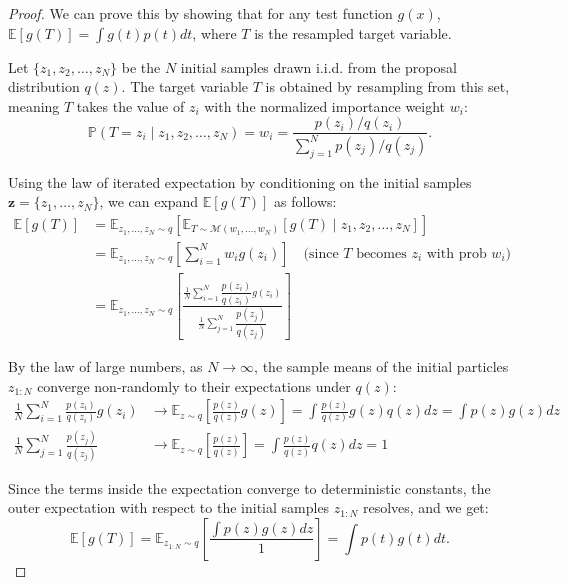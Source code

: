 \documentclass{article}
\begin{document}
        \begin{proof}
            We can prove this by showing that for any test function $g(x)$, $\mathbb{E}[g(T)] = \displaystyle\int g(t)p(t)dt$, where $T$ is the resampled target variable.
            
            Let $\{z_1, z_2, \dots, z_N\}$ be the $N$ initial samples drawn i.i.d. from the proposal distribution $q(z)$. 
            The target variable $T$ is obtained by resampling from this set, meaning $T$ takes the value of $z_i$ with the normalized importance weight $w_i$:
            \[
            \mathbb P(T = z_i \mid z_1, z_2, \dots, z_N) = w_i = \frac{p(z_i)/q(z_i)}{\sum_{j=1}^{N} p(z_j)/q(z_j)}.
            \]
            
            Using the law of iterated expectation by conditioning on the initial samples $\mathbf{z} = \{z_1, \dots, z_N\}$, we can expand $\mathbb{E}[g(T)]$ as follows:
            \begin{align*}
                \mathbb{E}[g(T)] &= \mathbb{E}_{z_1,\dots,z_N \sim q}\left[\mathbb{E}_{T \sim \mathcal M(w_1,\dots,w_N)}[g(T) \mid z_1,z_2,\dots,z_N]\right]
                \\ &= \mathbb{E}_{z_1,\dots,z_N \sim q}\left[\sum_{i=1}^{N} w_i g(z_i)\right] \quad \text{(since } T \text{ becomes } z_i \text{ with prob } w_i \text{)}
                \\ &= \mathbb{E}_{z_1,\dots,z_N \sim q}\left[\frac{\displaystyle\frac{1}{N}\sum_{i=1}^{N}\dfrac{p(z_i)}{q(z_i)}g(z_i)}{\displaystyle\frac{1}{N}\sum_{j=1}^{N}\dfrac{p(z_j)}{q(z_j)}}\right]
            \end{align*}
            
            By the law of large numbers, as $N \rightarrow \infty$, the sample means of the initial particles $z_{1:N}$ converge non-randomly to their expectations under $q(z)$:
            \begin{align*}
                \frac{1}{N}\sum_{i=1}^{N}\frac{p(z_i)}{q(z_i)}g(z_i) &\longrightarrow \mathbb{E}_{z \sim q}\left[\frac{p(z)}{q(z)}g(z)\right] = \int \frac{p(z)}{q(z)}g(z)q(z)dz = \int p(z)g(z)dz
                \\ \frac{1}{N}\sum_{j=1}^{N}\frac{p(z_j)}{q(z_j)} &\longrightarrow \mathbb{E}_{z \sim q}\left[\frac{p(z)}{q(z)}\right] = \int \frac{p(z)}{q(z)}q(z)dz = 1
            \end{align*}
            
            Since the terms inside the expectation converge to deterministic constants, the outer expectation with respect to the initial samples $z_{1:N}$ resolves, and we get:
            \[
                \mathbb{E}[g(T)] = \mathbb{E}_{z_{1:N} \sim q}\left[ \dfrac{\int p(z)g(z)dz}{1} \right] = \displaystyle\int p(t)g(t)dt.
            \]
        \end{proof}
\end{document}
